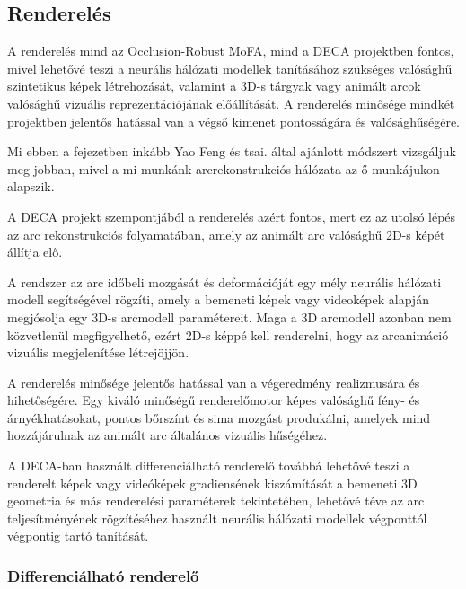 \documentclass[12pt,a4]{article}
\begin{document}
              \newpage
              
        \subsection{Renderelés}

            A renderelés mind az \cite{focus}Occlusion-Robust MoFA, mind a \cite{deca}DECA projektben fontos, mivel lehetővé teszi a neurális hálózati modellek tanításához szükséges valósághű szintetikus képek létrehozását, valamint a 3D-s tárgyak vagy animált arcok valósághű vizuális reprezentációjának előállítását. A renderelés minősége mindkét projektben jelentős hatással van a végső kimenet pontosságára és valósághűségére.

            Mi ebben a fejezetben inkább \cite{deca}Yao Feng és tsai. által ajánlott módszert vizsgáljuk meg jobban, mivel a mi munkánk arcrekonstrukciós hálózata az ő munkájukon alapszik.

            A DECA projekt szempontjából a renderelés azért fontos, mert ez az utolsó lépés az arc rekonstrukciós folyamatában, amely az animált arc valósághű 2D-s képét állítja elő.

            A rendszer az arc időbeli mozgását és deformációját egy mély neurális hálózati modell segítségével rögzíti, amely a bemeneti képek vagy videoképek alapján megjósolja egy 3D-s arcmodell paramétereit. Maga a 3D arcmodell azonban nem közvetlenül megfigyelhető, ezért 2D-s képpé kell renderelni, hogy az arcanimáció vizuális megjelenítése létrejöjjön.
            
            A renderelés minősége jelentős hatással van a végeredmény realizmusára és hihetőségére. Egy kiváló minőségű renderelőmotor képes valósághű fény- és árnyékhatásokat, pontos bőrszínt és sima mozgást produkálni, amelyek mind hozzájárulnak az animált arc általános vizuális hűségéhez.
            
            A DECA-ban használt differenciálható renderelő továbbá lehetővé teszi a renderelt képek vagy videóképek gradiensének kiszámítását a bemeneti 3D geometria és más renderelési paraméterek tekintetében, lehetővé téve az arc teljesítményének rögzítéséhez használt neurális hálózati modellek végponttól végpontig tartó tanítását.

            \subsubsection{Differenciálható renderelő}
\end{document}
